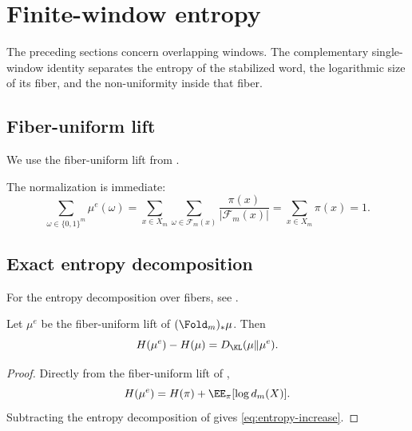\section{Finite-window entropy}\label{sec:entropy-ledger}

The preceding sections concern overlapping windows. The complementary single-window identity separates the entropy of the stabilized word, the logarithmic size of its fiber, and the non-uniformity inside that fiber.

\subsection{Fiber-uniform lift}\label{sec:entropy-ledger:lifts}

\begin{definition}\label{def:fiber-lift}
We use the fiber-uniform lift from
\cite[Definition~5.1]{MaZhang2026Nonlinearity}.
\end{definition}

\begin{remark}
The normalization is immediate:
\[
\sum_{\omega\in\{0,1\}^m}\mu^e(\omega)
=
\sum_{x\in X_m}\sum_{\omega\in\mathcal{F}_m(x)}\frac{\pi(x)}{|\mathcal{F}_m(x)|}
=
\sum_{x\in X_m}\pi(x)=1.
\]
\end{remark}

\subsection{Exact entropy decomposition}\label{sec:entropy-ledger:identity}

\begin{proposition}\label{thm:kl-ledger}
For the entropy decomposition over fibers, see
\cite[Theorem~5.1]{MaZhang2026Nonlinearity}.
\end{proposition}

\begin{corollary}\label{cor:entropy-increase}
Let $\mu^e$ be the fiber-uniform lift of $(\Fold_m)_*\mu$. Then
\begin{equation}\label{eq:entropy-increase}
H(\mu^e)-H(\mu)=D_{\KL}(\mu\|\mu^e).
\end{equation}
\end{corollary}

\begin{proof}
Directly from the fiber-uniform lift of
\cite[Definition~5.1]{MaZhang2026Nonlinearity},
\[
H(\mu^e)=H(\pi)+\EE_\pi[\log d_m(X)].
\]
Subtracting the entropy decomposition of
\cite[Theorem~5.1]{MaZhang2026Nonlinearity} gives
\eqref{eq:entropy-increase}.
\end{proof}

